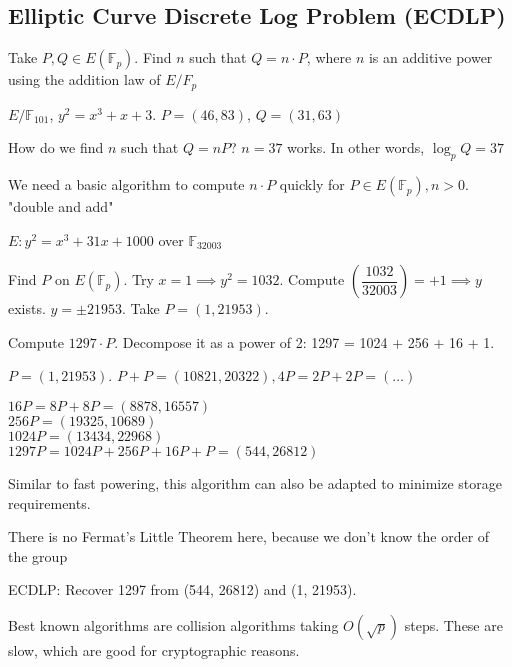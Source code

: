 \documentclass[10pt]{article}
\newcommand{\F}{\mathbb{F}}
\begin{document}
\subsection{Elliptic Curve Discrete Log Problem (ECDLP)}
\begin{defn}
    Take $P, Q \in E(\F_p)$. Find $n$ such that $Q = n\cdot P$, where $n$ is an additive power using the addition law of $E/F_p$
\end{defn}

\begin{exm*}
    $E/\F_{101}$, $y^2 = x^3 + x + 3$. $P = (46, 83)$, $Q = (31, 63)$
\end{exm*}
How do we find $n$ such that $Q = nP$? $n = 37$ works. In other words, $\log_p Q = 37$

We need a basic algorithm to compute $n \cdot P$ quickly for $P \in E(\F_p), n > 0$. "double and add"

\begin{exm*}
    $E: y^2 = x^3 + 31x + 1000$ over $\F_{32003}$ %
\end{exm*}

Find $P$ on $E(\F_p)$. Try $x = 1 \implies y^2 = 1032$. Compute $\left(\dfrac{1032}{32003}\right) = +1 \implies y$ exists. $y = \pm 21953$. Take $P = (1, 21953)$.

Compute $1297 \cdot P$. Decompose it as a power of 2: 1297 = 1024 + 256 + 16 + 1.

$P = (1, 21953)$. $P + P = (10821, 20322), 4P = 2P + 2P = (\ldots)$

$16P = 8P + 8P = (8878, 16557)$\\
$256P = (19325, 10689)$\\
$1024P = (13434, 22968)$\\
$1297P = 1024P + 256P + 16P + P = (544, 26812)$

\begin{rmk}
    Similar to fast powering, this algorithm can also be adapted to minimize storage requirements.
\end{rmk}

\begin{rmk}
    There is no Fermat's Little Theorem here, because we don't know the order of the group
\end{rmk}

ECDLP: Recover 1297 from (544, 26812) and (1, 21953).

Best known algorithms are collision algorithms taking $O(\sqrt{p})$ steps. These are slow, which are good for cryptographic reasons.
\end{document}
